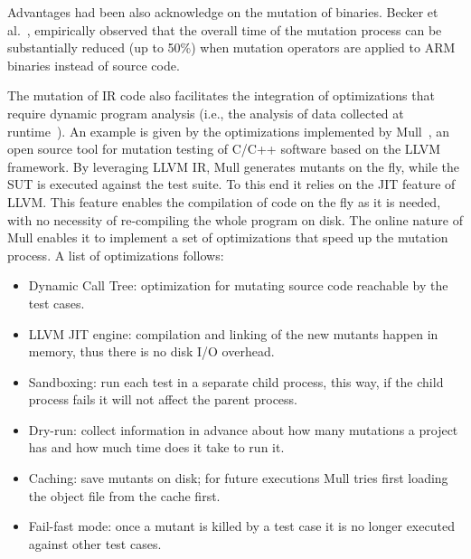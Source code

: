 

Advantages had been also acknowledge on the mutation of binaries. Becker et al.~\cite{becker2012xemu}, empirically observed that the overall time of the mutation process can be 
substantially reduced (up to 50\%) when mutation operators are applied to ARM binaries instead of source code.

The mutation of IR code also facilitates the integration of optimizations that require dynamic program analysis (i.e., the analysis of data collected at runtime~\cite{Pezze:Book}). An example is given by the optimizations implemented by Mull~\cite{denisov2018mull}, an open source tool for mutation testing of C/C++ software based on the LLVM framework. By leveraging LLVM IR, Mull generates mutants on the fly, while the SUT is executed against the test suite. To this end it relies on the JIT feature of LLVM. This feature enables the compilation of code on the fly as it is needed, with no necessity of re-compiling the whole program on disk. The online nature of Mull enables it to implement a set of optimizations that speed up the mutation process. A list of optimizations follows:
\begin{itemize}
	\item Dynamic Call Tree: optimization for mutating source code reachable by the test cases.
	\item LLVM JIT engine: compilation and linking of the new mutants happen in memory, thus there is no disk I/O overhead.
	\item Sandboxing: run each test in a separate child process, this way, if the child process fails it will not affect the parent process.
	\item Dry-run: collect information in advance about how many mutations a project has and how much time does it take to run it.
	\item Caching: save mutants on disk; for future executions Mull tries first loading the object file from the cache first.
	\item Fail-fast mode: once a mutant is killed by a test case it is no longer executed against other test cases.
\end{itemize}


